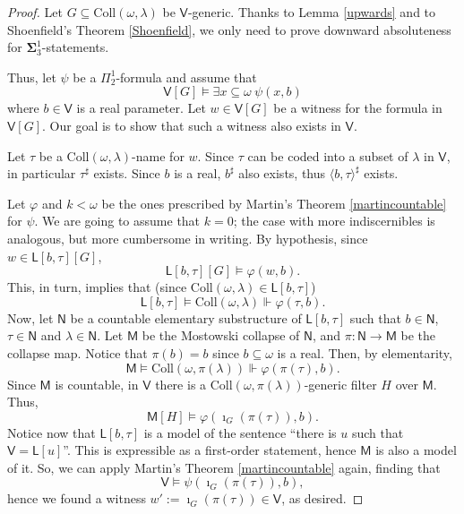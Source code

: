 \documentclass[10pt,a4paper]{amsart}
\begin{document}
\begin{proof}
Let $G\subseteq\mathrm{Coll}(\omega,\lambda)$ be $\mathsf V$-generic. Thanks to Lemma \ref{upwards} and to Shoenfield's Theorem \ref{Shoenfield}, we only need to prove downward absoluteness for $\boldsymbol\Sigma^1_3$-statements.\medskip

Thus, let $\psi$ be a $\Pi^1_2$-formula and assume that
\[\mathsf V[G]\models \exists x\subseteq\omega\ \psi(x,b)\]
where $b\in\mathsf V$ is a real parameter. Let $w\in\mathsf V[G]$ be a witness for the formula in $\mathsf V[G]$. Our goal is to show that such a witness also exists in $\mathsf V$.\medskip

Let $\tau$ be a $\mathrm{Coll}(\omega,\lambda)$-name for $w$. Since $\tau$ can be coded into a subset of $\lambda$ in $\mathsf V$, in particular $\tau^\sharp$ exists. Since $b$ is a real, $b^\sharp$ also exists, thus $\langle b,\tau\rangle^\sharp$ exists.\medskip

Let $\varphi$ and $k<\omega$ be the ones prescribed by Martin's Theorem \ref{martincountable} for $\psi$. We are going to assume that $k=0$; the case with more indiscernibles is analogous, but more cumbersome in writing. By hypothesis, since $w\in \mathsf L[b,\tau][G]$,
\[\mathsf L[b,\tau][G] \models \varphi(w,b).\]
This, in turn, implies that (since $\mathrm{Coll}(\omega,\lambda)\in\mathsf L[b,\tau]$)
\[\mathsf L[b,\tau] \models \mathrm{Coll}(\omega,\lambda)\Vdash \varphi(\tau,b).\]
Now, let $\mathsf N$ be a countable elementary substructure of $\mathsf L[b,\tau]$ such that $b\in\mathsf N$, $\tau\in \mathsf N$ and $\lambda\in\mathsf N$. Let $\mathsf M$ be the Mostowski collapse of $\mathsf N$, and $\pi:\mathsf N\to\mathsf M$ be the collapse map. Notice that $\pi(b)=b$ since $b\subseteq\omega$ is a real. Then, by elementarity,
\[\mathsf M\models \mathrm{Coll}(\omega,\pi(\lambda))\Vdash \varphi(\pi(\tau),b).\]
Since $\mathsf M$ is countable, in $\mathsf V$ there is a $\mathrm{Coll}(\omega,\pi(\lambda))$-generic filter $H$ over $\mathsf M$. Thus, \[\mathsf M[H]\models \varphi(\imath_G(\pi(\tau)),b).\]
Notice now that $\mathsf L[b,\tau]$ is a model of the sentence ``there is $u$ such that $\mathsf V=\mathsf L[u]$''. This is expressible as a first-order statement, hence $\mathsf M$ is also a model of it. So, we can apply Martin's Theorem \ref{martincountable} again, finding that
\[\mathsf V\models \psi(\imath_G(\pi(\tau)),b),\]
hence we found a witness $w':=\imath_G(\pi(\tau))\in\mathsf V$, as desired.
\end{proof}
\end{document}
